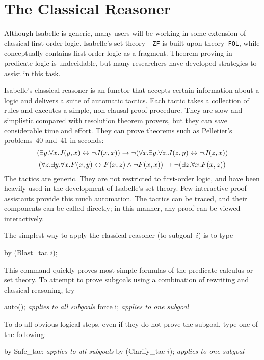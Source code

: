 \chapter{The Classical Reasoner}\label{chap:classical}
\newcommand\ainfer[2]{\begin{array}{r@{\,}l}#2\\ \hline#1\end{array}}

Although Isabelle is generic, many users will be working in some
extension of classical first-order logic.  Isabelle's set theory~{\tt
  ZF} is built upon theory~\texttt{FOL}, while {\HOL}
conceptually contains first-order logic as a fragment.
Theorem-proving in predicate logic is undecidable, but many
researchers have developed strategies to assist in this task.

Isabelle's classical reasoner is an \ML{} functor that accepts certain
information about a logic and delivers a suite of automatic tactics.  Each
tactic takes a collection of rules and executes a simple, non-clausal proof
procedure.  They are slow and simplistic compared with resolution theorem
provers, but they can save considerable time and effort.  They can prove
theorems such as Pelletier's~\cite{pelletier86} problems~40 and~41 in
seconds:
\[ (\exists y. \forall x. J(y,x) \leftrightarrow \neg J(x,x))  
   \rightarrow  \neg (\forall x. \exists y. \forall z. J(z,y) \leftrightarrow \neg J(z,x)) \]
\[ (\forall z. \exists y. \forall x. F(x,y) \leftrightarrow F(x,z) \wedge \neg F(x,x))
   \rightarrow \neg (\exists z. \forall x. F(x,z))  
\]
%
The tactics are generic.  They are not restricted to first-order logic, and
have been heavily used in the development of Isabelle's set theory.  Few
interactive proof assistants provide this much automation.  The tactics can
be traced, and their components can be called directly; in this manner,
any proof can be viewed interactively.

The simplest way to apply the classical reasoner (to subgoal~$i$) is to type
\begin{ttbox}
by (Blast_tac \(i\));
\end{ttbox}
This command quickly proves most simple formulas of the predicate calculus or
set theory.  To attempt to prove subgoals using a combination of
rewriting and classical reasoning, try
\begin{ttbox}
auto();                         \emph{\textrm{applies to all subgoals}}
force i;                        \emph{\textrm{applies to one subgoal}}
\end{ttbox}
To do all obvious logical steps, even if they do not prove the
subgoal, type one of the following:
\begin{ttbox}
by Safe_tac;                   \emph{\textrm{applies to all subgoals}}
by (Clarify_tac \(i\));        \emph{\textrm{applies to one subgoal}}
\end{ttbox}


